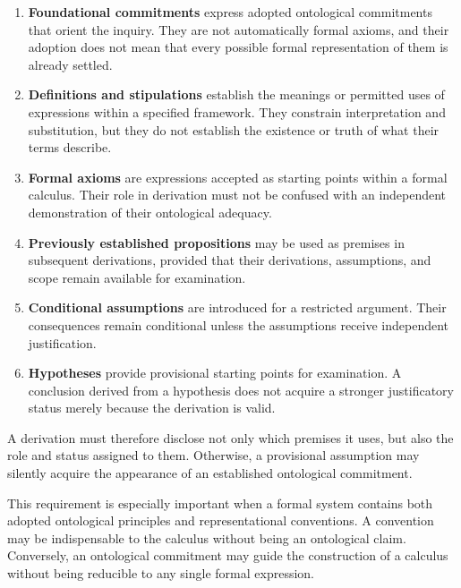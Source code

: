 \begin{enumerate}
    \item \textbf{Foundational commitments} express adopted
    ontological commitments that orient the inquiry. They are not
    automatically formal axioms, and their adoption does not mean
    that every possible formal representation of them is already
    settled.

    \item \textbf{Definitions and stipulations} establish the
    meanings or permitted uses of expressions within a specified
    framework. They constrain interpretation and substitution, but
    they do not establish the existence or truth of what their terms
    describe.

    \item \textbf{Formal axioms} are expressions accepted as starting
    points within a formal calculus. Their role in derivation must
    not be confused with an independent demonstration of their
    ontological adequacy.

    \item \textbf{Previously established propositions} may be used
    as premises in subsequent derivations, provided that their
    derivations, assumptions, and scope remain available for
    examination.

    \item \textbf{Conditional assumptions} are introduced for a
    restricted argument. Their consequences remain conditional
    unless the assumptions receive independent justification.

    \item \textbf{Hypotheses} provide provisional starting points
    for examination. A conclusion derived from a hypothesis does
    not acquire a stronger justificatory status merely because the
    derivation is valid.
\end{enumerate}

A derivation must therefore disclose not only which premises it
uses, but also the role and status assigned to them. Otherwise, a
provisional assumption may silently acquire the appearance of an
established ontological commitment.

This requirement is especially important when a formal system
contains both adopted ontological principles and representational
conventions. A convention may be indispensable to the calculus
without being an ontological claim. Conversely, an ontological
commitment may guide the construction of a calculus without being
reducible to any single formal expression.

